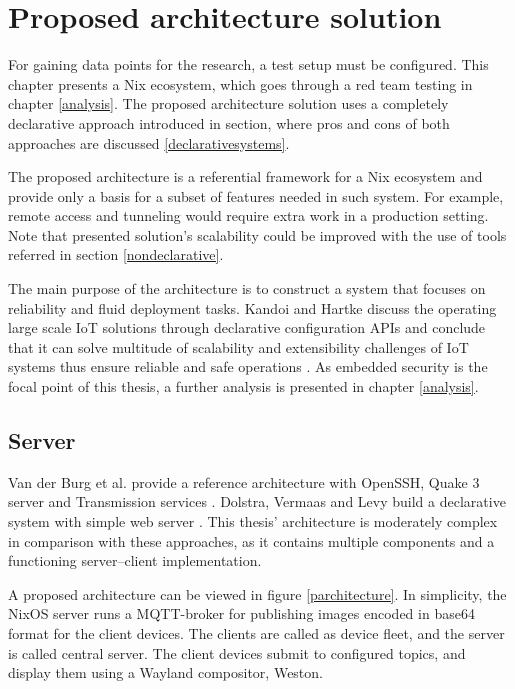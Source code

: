 \chapter{Proposed architecture solution} \label{architecture}

For gaining data points for the research, a test setup must be
configured. This chapter presents a Nix ecosystem, which goes through
a red team testing in chapter \ref{analysis}. The proposed
architecture solution uses a completely declarative approach
introduced in section, where pros and cons of both approaches are
discussed \ref{declarativesystems}.

The proposed architecture is a referential framework for a Nix
ecosystem and provide only a basis for a subset of features needed in
such system. For example, remote access and tunneling would require
extra work in a production setting. Note that presented solution's
scalability could be improved with the use of tools referred in
section \ref{nondeclarative}.

The main purpose of the architecture is to construct a system that
focuses on reliability and fluid deployment tasks. Kandoi and Hartke
discuss the operating large scale IoT solutions through declarative
configuration APIs and conclude that it can solve multitude of
scalability and extensibility challenges of IoT systems thus ensure
reliable and safe operations \cite{kandoi2021operating}. As embedded
security is the focal point of this thesis, a further analysis is
presented in chapter \ref{analysis}.

\section{Server}

Van der Burg et al. provide a reference architecture with OpenSSH,
Quake 3 server and Transmission services
\cite{van2013reference}. Dolstra, Vermaas and Levy build a declarative
system with simple web server \cite{dolstra2013charon}. This thesis'
architecture is moderately complex in comparison with these
approaches, as it contains multiple components and a functioning
server–client implementation.

A proposed architecture can be viewed in figure
\ref{parchitecture}. In simplicity, the NixOS server runs a
MQTT-broker for publishing images encoded in base64 format for the
client devices. The clients are called as device fleet, and the server
is called central server. The client devices submit to configured
topics, and display them using a Wayland compositor, Weston.

